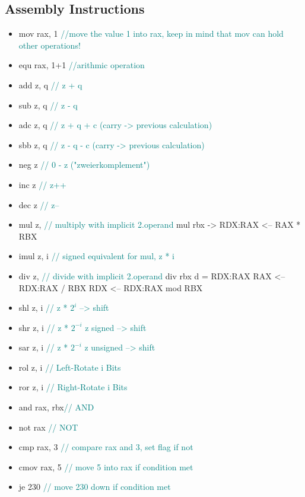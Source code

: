 \documentclass[main.tex,fontsize=8pt,paper=a4,paper=landscape,DIV=calc,]{scrartcl}
\begin{document}
\begin{multicols*}{4}
\subsection{Assembly Instructions}
\begin{itemize}
\item mov rax, 1 \textcolor{teal}{//move the value 1 into rax, keep in mind that mov can hold other operations!}
\item equ rax, 1+1 \textcolor{teal}{//arithmic operation}
\item add z,   q  \textcolor{teal}{// z + q} 
\item sub z,   q  \textcolor{teal}{// z - q}
\item adc z,   q  \textcolor{teal}{// z + q + c (carry -> previous calculation)}
\item sbb z,   q  \textcolor{teal}{// z - q - c (carry -> previous calculation)}
\item neg z       \textcolor{teal}{// 0 - z ("zweierkomplement")}
\item inc z       \textcolor{teal}{// z++ }
\item dec z       \textcolor{teal}{// z-- }
\item mul z,      \textcolor{teal}{// multiply with implicit 2.operand }\newline
mul rbx -> RDX:RAX <-- RAX * RBX
\item imul z,   i  \textcolor{teal}{// signed equivalent for mul, z * i }
\item div z,      \textcolor{teal}{// divide with implicit 2.operand}\newline
div rbx  \newline
d = RDX:RAX\newline
RAX <-- RDX:RAX / RBX\newline
RDX <-- RDX:RAX mod RBX
\item shl z,   i  \textcolor{teal}{// z * \(2^i\)               --> shift}
\item shr z,   i  \textcolor{teal}{// z * \(2^{-i}\) z signed   --> shift}
\item sar z,   i  \textcolor{teal}{// z * \(2^{-i}\) z unsigned --> shift}
\item rol z,   i  \textcolor{teal}{// Left-Rotate i Bits }
\item ror z,   i  \textcolor{teal}{// Right-Rotate i Bits }
\item and rax, rbx\textcolor{teal}{// AND}
\item not rax     \textcolor{teal}{// NOT}
\item cmp rax, 3 \textcolor{teal}{// compare rax and 3, set flag if not}
\item cmov rax, 5 \textcolor{teal}{// move 5 into rax if condition met}
\item je 230 \textcolor{teal}{// move 230 down if condition met}
\end{itemize}


\end{multicols*}
\end{document}
